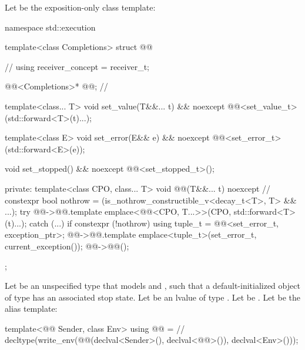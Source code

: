 \pnum
Let  be the exposition-only class template:

%
\begin{codeblock}
namespace std::execution {
  template<class Completions>
  struct @@ {                                // \expos
    using receiver_concept = receiver_t;

    @@<Completions>* @@;                // \expos

    template<class... T>
      void set_value(T&&... t) && noexcept {
        @@<set_value_t>(std::forward<T>(t)...);
      }

    template<class E>
      void set_error(E&& e) && noexcept {
        @@<set_error_t>(std::forward<E>(e));
      }

    void set_stopped() && noexcept {
      @@<set_stopped_t>();
    }

  private:
    template<class CPO, class... T>
      void @@(T&&... t) noexcept {                    // \expos
        constexpr bool nothrow = (is_nothrow_constructible_v<decay_t<T>, T> && ...);
        try {
          @@->@@.template emplace<@@<CPO, T...>>(CPO{},
                                                                   std::forward<T>(t)...);
        }
        catch (...) {
          if constexpr (!nothrow) {
            using tuple_t = @@<set_error_t, exception_ptr>;
            @@->@@.template emplace<tuple_t>(set_error_t{}, current_exception());
          }
        }
        @@->@@();
      }
  };
}
\end{codeblock}

\pnum
Let  be an unspecified type
that models  and ,
such that a default-initialized object of type 
has an associated stop state.
Let  be an lvalue of type .
Let  be .
Let  be the alias template:

\begin{codeblock}
template<@@ Sender, class Env>
using @@ =                                   // \expos
  decltype(write_env(@@(declval<Sender>(), declval<@@>()), declval<Env>()));
\end{codeblock}

